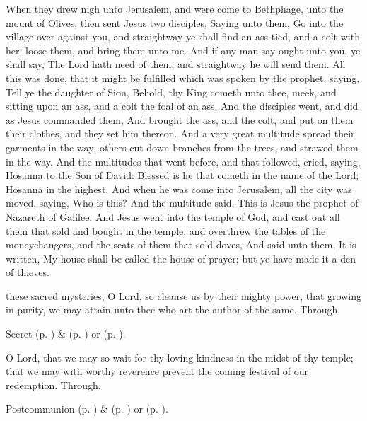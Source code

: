  When they drew nigh unto Jerusalem, and were come to Bethphage, unto the mount of Olives, then sent Jesus two disciples, Saying unto them, Go into the village over against you, and straightway ye shall find an ass tied, and a colt with her: loose them, and bring them unto me. And if any man say ought unto you, ye shall say, The Lord hath need of them; and straightway he will send them. All this was done, that it might be fulfilled which was spoken by the prophet, saying, Tell ye the daughter of Sion, Behold, thy King cometh unto thee, meek, and sitting upon an ass, and a colt the foal of an ass. And the disciples went, and did as Jesus commanded them, And brought the ass, and the colt, and put on them their clothes, and they set him thereon. And a very great multitude spread their garments in the way; others cut down branches from the trees, and strawed them in the way. And the multitudes that went before, and that followed, cried, saying, Hosanna to the Son of David: Blessed is he that cometh in the name of the Lord; Hosanna in the highest. And when he was come into Jerusalem, all the city was moved, saying, Who is this? And the multitude said, This is Jesus the prophet of Nazareth of Galilee. And Jesus went into the temple of God, and cast out all them that sold and bought in the temple, and overthrew the tables of the moneychangers, and the seats of them that sold doves, And said unto them, It is written, My house shall be called the house of prayer; but ye have made it a den of thieves.

\clearpage
\secret\label{AdventISecret}
 these sacred mysteries, O Lord, so cleanse us by their mighty power, that growing in purity, we may attain unto thee who art the author of the same. Through.
\begin{rubric}
     Secret  (p. \pageref{SPMaryInAdvent}) \&   (p. \pageref{SPAgainst}) or  (p. \pageref{SPChiefBishop}).
\end{rubric}
\postcommunion\label{AdventIPostcommunion}
 O Lord, that we may so wait for thy loving-kindness in the midst of thy temple; that we may with worthy reverence prevent the coming festival of our redemption. Through.
\begin{rubric}
     Postcommunion  (p. \pageref{SPMaryInAdvent}) \&   (p. \pageref{SPAgainst}) or  (p. \pageref{SPChiefBishop}).
\end{rubric}

